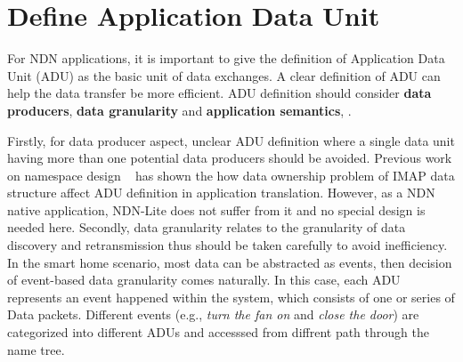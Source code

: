 \section{Define Application Data Unit}
\label{sec:application-data-unit}
For NDN applications, it is important to give the definition of Application Data Unit (ADU) as the basic unit of data exchanges.
A clear definition of ADU can help the data transfer be more efficient.
ADU definition should consider \textbf{data producers}, \textbf{data granularity} and \textbf{application semantics}, .

Firstly, for data producer aspect, unclear ADU definition where a single data unit having more than one potential data producers should be avoided. 
Previous work on namespace design ~\cite{liang2018ndnizing} has shown the how data ownership problem of IMAP data structure affect ADU definition in application translation.
However, as a NDN native application, NDN-Lite does not suffer from it and no special design is needed here.
Secondly, data granularity relates to the granularity of data discovery and retransmission thus should be taken carefully to avoid inefficiency.
In the smart home scenario, most data can be abstracted as events, then decision of event-based data granularity comes naturally.
In this case, each ADU represents an event happened within the system, which consists of one or series of Data packets.
Different events (e.g., \textit{turn the fan on} and \textit{close the door}) are categorized into different ADUs and accesssed from diffrent path through the name tree.

